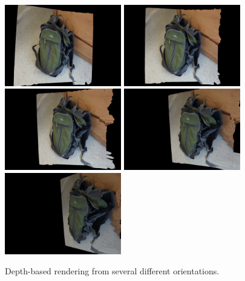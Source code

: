 \documentclass[conference]{acmsiggraph}
\begin{document}
\begin{figure}[ht]
  \centering
  \includegraphics[width=2in]{images/r1}
  \includegraphics[width=2in]{images/r2}
  \includegraphics[width=2in]{images/r3}
  \includegraphics[width=2in]{images/r4}
  \includegraphics[width=2in]{images/r5}
  \caption{Depth-based rendering from several different orientations.}
  \label{fig:rendering}
\end{figure}



\end{document}

